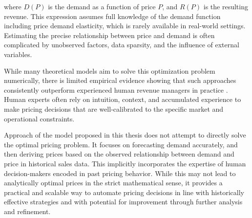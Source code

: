 where $D(P)$ is the demand as a function of price $P$, and $R(P)$ is the resulting revenue. This expression assumes full knowledge of the demand function including price demand elasticity, which is rarely available in real-world settings. Estimating the precise relationship between price and demand is often complicated by unobserved factors, data sparsity, and the influence of external variables.

While many theoretical models aim to solve this optimization problem numerically, there is limited empirical evidence showing that such approaches consistently outperform experienced human revenue managers in practice \cite{Rust2018OptimalDH}. Human experts often rely on intuition, context, and accumulated experience to make pricing decisions that are well-calibrated to the specific market and operational constraints.

\medskip
Approach of the model proposed in this thesis does not attempt to directly solve the optimal pricing problem. It focuses on forecasting demand accurately, and then deriving prices based on the observed relationship between demand and price in historical sales data. This implicitly incorporates the expertise of human decision-makers encoded in past pricing behavior. While this may not lead to analytically optimal prices in the strict mathematical sense, it provides a practical and scalable way to automate pricing decisions in line with historically effective strategies and with  potential for improvement through further analysis and refinement.